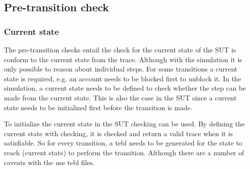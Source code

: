 \subsection{Pre-transition check}

\subsubsection*{Current state}
\label{sec:ch5-current-state}

The pre-transition checks entail the check for the current state of the SUT is
conform to the current state from the trace. Although with the simulation it is
only possible to reason about individual steps. For some transitions a current
state is required, e.g. an account needs to be blocked first to unblock it. In
the simulation, a current state needs to be defined to check whether the step
can be made from the current state. This is also the case in the SUT since a
current state needs to be initialized first before the transition is made.

To initialize the current state in the SUT checking can be used. By defining
the current state with checking, it is checked and return a valid trace when
it is satisfiable. So for every transition, a tebl needs to be generated for the
state to reach (current state) to perform the transition. Although there are a
number of caveats with the use tebl files.

